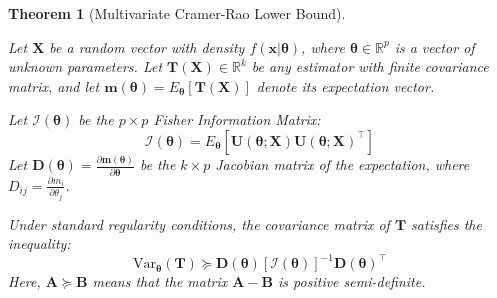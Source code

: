\documentclass[
  letterpaper,
  DIV=11,
  numbers=noendperiod]{scrreprt}
\renewcommand{\[}{\begin{equation}}
\renewcommand{\]}{\end{equation}}
\theoremstyle{definition}
\theoremstyle{plain}
\theoremstyle{plain}
\theoremstyle{plain}
\newtheorem{theorem}{Theorem}[chapter]
\theoremstyle{definition}
\theoremstyle{plain}
\theoremstyle{remark}
\begin{document}
\begin{theorem}[Multivariate Cramer-Rao Lower
Bound]\protect\hypertarget{thm-multivariate-crlb}{}\label{thm-multivariate-crlb}

Let \(\mathbf{X}\) be a random vector with density
\(f(\mathbf{x}|\boldsymbol{\theta})\), where
\(\boldsymbol{\theta} \in \mathbb{R}^p\) is a vector of unknown
parameters. Let \(\mathbf{T}(\mathbf{X}) \in \mathbb{R}^k\) be any
estimator with finite covariance matrix, and let
\(\mathbf{m}(\boldsymbol{\theta}) = E_{\boldsymbol{\theta}}[\mathbf{T}(\mathbf{X})]\)
denote its expectation vector.

Let \(\mathcal{I}(\boldsymbol{\theta})\) be the \(p \times p\) Fisher
Information Matrix: \[
\mathcal{I}(\boldsymbol{\theta}) = E_{\boldsymbol{\theta}} \left[ \mathbf{U}(\boldsymbol{\theta}; \mathbf{X}) \mathbf{U}(\boldsymbol{\theta}; \mathbf{X})^\top \right]
\] Let
\(\mathbf{D}(\boldsymbol{\theta}) = \frac{\partial \mathbf{m}(\boldsymbol{\theta})}{\partial \boldsymbol{\theta}}\)
be the \(k \times p\) Jacobian matrix of the expectation, where
\(D_{ij} = \frac{\partial m_i}{\partial \theta_j}\).

Under standard regularity conditions, the covariance matrix of
\(\mathbf{T}\) satisfies the inequality: \[
\text{Var}_{\boldsymbol{\theta}}(\mathbf{T}) \succeq \mathbf{D}(\boldsymbol{\theta}) [\mathcal{I}(\boldsymbol{\theta})]^{-1} \mathbf{D}(\boldsymbol{\theta})^\top
\] Here, \(\mathbf{A} \succeq \mathbf{B}\) means that the matrix
\(\mathbf{A} - \mathbf{B}\) is positive semi-definite.

\end{theorem}
\end{document}

